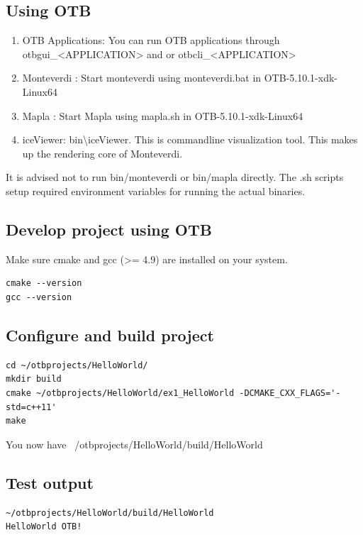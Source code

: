 \documentclass[10pt,a4paper]{article}
\begin{document}
\subsection{Using OTB}
\begin{enumerate}
\item OTB Applications: You can run OTB applications through otbgui\_<APPLICATION> and or otbcli\_<APPLICATION> 
\item Monteverdi : Start monteverdi using monteverdi.bat in OTB-5.10.1-xdk-Linux64
\item Mapla : Start Mapla using mapla.sh in OTB-5.10.1-xdk-Linux64
\item iceViewer: bin{\textbackslash}iceViewer. This is commandline visualization tool. This makes up the rendering core of Monteverdi.
\end{enumerate}
It is advised not to run bin/monteverdi or bin/mapla directly.
\newline
The .sh scripts setup required environment variables for running the actual binaries.
\newline

\subsection{Develop project using OTB}
Make sure cmake and gcc (>= 4.9) are installed on your system.
\newline
\begin{verbatim}
cmake --version
gcc --version
\end{verbatim}

\subsection{Configure and build project}

\begin{verbatim}
cd ~/otbprojects/HelloWorld/
mkdir build
cmake ~/otbprojects/HelloWorld/ex1_HelloWorld -DCMAKE_CXX_FLAGS='-std=c++11'
make
\end{verbatim}
You now have ~/otbprojects/HelloWorld/build/HelloWorld
\newline
\subsection{Test output}

\begin{verbatim}
~/otbprojects/HelloWorld/build/HelloWorld
HelloWorld OTB!
\end{verbatim}
\end{document}
